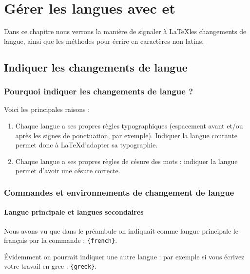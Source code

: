 \chapter{Gérer les langues avec  et }\label{i18n}

\begin{intro}
    Dans ce chapitre nous verrons la manière de signaler à \LaTeX les changements de langue, ainsi que les méthodes pour écrire en caractères non latins.
\end{intro}

\section{Indiquer les changements de langue}

\subsection{Pourquoi indiquer les changements de langue ?}

Voici les principales raisons :
\begin{enumerate}
\item Chaque langue  a ses propres règles typographiques (espacement avant et/ou après les signes de ponctuation, par exemple). Indiquer la langue courante permet donc à \LaTeX d'adapter sa typographie.
\item Chaque langue a ses propres règles de césure des mots : indiquer la langue permet d'avoir une césure correcte.
\end{enumerate}


\subsection{Commandes et environnements de changement de langue}

\subsubsection{Langue principale et langues secondaires}

Nous avons vu que dans le préambule on indiquait comme langue principale le français  par la commande : \verb|{french}|.




Évidemment on pourrait indiquer une autre langue :  par exemple si vous écrivez votre travail en grec :
\verb|{greek}|.


